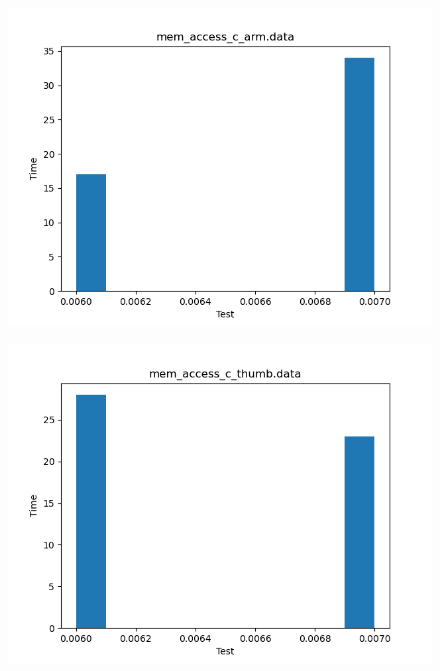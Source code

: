 \documentclass[a4paper,10pt]{article}
\begin{document}
\begin{figure}[H]
 \includegraphics[width=\linewidth]{data/mem_access_c_arm_histogram.png}
\end{figure}

\begin{figure}[H]
 \includegraphics[width=\linewidth]{data/mem_access_c_thumb_histogram.png}
\end{figure}
\end{document}
